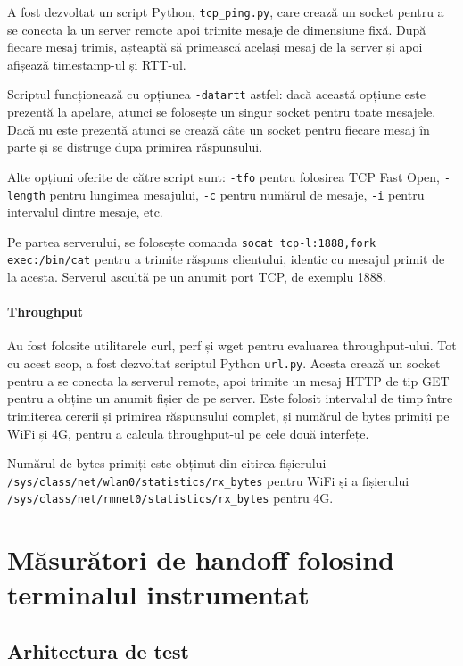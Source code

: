 A fost dezvoltat un script Python, \texttt{tcp\_ping.py}, care crează un socket pentru a se conecta la un server remote apoi trimite mesaje de dimensiune fixă. După fiecare mesaj trimis, așteaptă să primească același mesaj de la server și apoi afișează timestamp-ul și RTT-ul. 

Scriptul funcționează cu opțiunea \texttt{-datartt} astfel: dacă această opțiune este prezentă la apelare, atunci se folosește un singur socket pentru toate mesajele. Dacă nu este prezentă atunci se crează câte un socket pentru fiecare mesaj în parte și se distruge dupa primirea răspunsului.

Alte opțiuni oferite de către script sunt: \texttt{-tfo} pentru folosirea TCP Fast Open,  \texttt{-length} pentru lungimea mesajului, \texttt{-c} pentru numărul de mesaje, \texttt{-i} pentru intervalul dintre mesaje, etc.

Pe partea serverului, se folosește comanda \texttt{socat tcp-l:1888,fork exec:/bin/cat} pentru a trimite răspuns clientului, identic cu mesajul primit de la acesta. Serverul ascultă pe un anumit port TCP, de exemplu 1888.

\subsubsection{Throughput}

Au fost folosite utilitarele curl, perf și wget pentru evaluarea throughput-ului. Tot cu acest scop, a fost dezvoltat scriptul Python \texttt{url.py}. Acesta crează un socket pentru a se conecta la serverul remote, apoi trimite un mesaj HTTP de tip GET pentru a obține un anumit fișier de pe server. Este folosit intervalul de timp între trimiterea cererii și primirea răspunsului complet, și numărul de bytes primiți pe WiFi și 4G, pentru a calcula throughput-ul pe cele două interfețe. 

Numărul de bytes primiți este obținut din citirea fișierului \texttt{/sys/class/net/wlan0/statistics/rx\_bytes} pentru WiFi și a fișierului \texttt{/sys/class/net/rmnet0/statistics/rx\_bytes} pentru 4G.

\chapter{Măsurători de handoff folosind terminalul instrumentat}

\section{Arhitectura de test}

